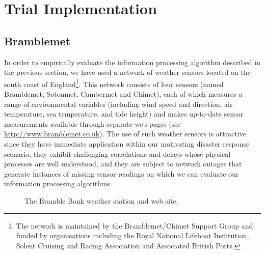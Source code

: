 \documentclass{acmtrans2m}
\begin{document}
\section{Trial Implementation}\label{sec_implementation}

\subsection{Bramblemet}

\noindent In order to empirically evaluate the information processing algorithm described in the previous section, we have used a network of weather sensors located on the south coast of England\footnote{The network is maintained by the Bramblemet/Chimet Support Group and funded by organisations including the Royal National Lifeboat Institution, Solent Cruising and Racing Association and Associated British Ports.}. This network consists of four sensors (named Bramblemet, Sotonmet, Cambermet and Chimet), each of which measures a range of environmental variables (including wind speed and direction, air temperature, sea temperature, and tide height) and makes up-to-date sensor measurements available through separate web pages (see \small\url{http://www.bramblemet.co.uk}\normalsize). The use of such weather sensors is attractive since they have immediate application within our motivating disaster response scenario, they exhibit challenging correlations and delays whose physical processes are well understood, and they are subject to network outages that generate instances of missing sensor readings on which we can evaluate our information processing algorithms.

\begin{figure}
\begin{center}
 \hspace{0.25cm}
\caption{The Bramble Bank weather station and web site.}
\label{bramble_sensor}
\end{center}
\end{figure}
\end{document}
